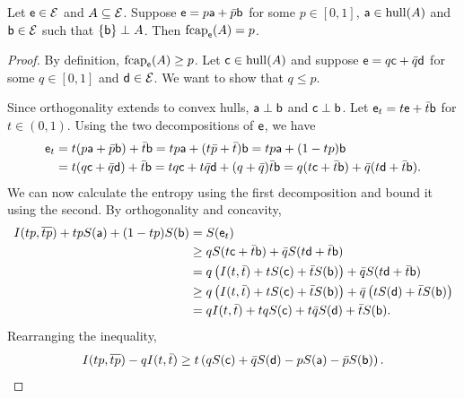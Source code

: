 \begin{mathSection}
\begin{prop}\label{pm-es-orthogonalComponentMaximality}
	Let $\ens \in \Ens$ and $A \subseteq \Ens$. Suppose $\ens = p\ens[a] + \bar{p}\ens[b]$ for some $p \in [0,1]$, $\ens[a] \in \hull(A)$ and $\ens[b] \in \Ens$ such that $\{\ens[b]\} \ortho A$. Then $\fcap_{\ens}(A) = p$.
\end{prop}

\begin{proof}
	By definition, $\fcap_{\ens}(A) \geq p$. Let $\ens[c] \in \hull(A)$ and suppose $\ens = q\ens[c] + \bar{q}\ens[d]$ for some $q \in [0,1]$ and $\ens[d] \in \Ens$. We want to show that $q \leq p$.
	
	Since orthogonality extends to convex hulls, $\ens[a] \ortho \ens[b]$ and $\ens[c] \ortho \ens[b]$. Let $\ens_t = t\ens + \bar{t}\ens[b]$ for $t \in (0,1)$. Using the two decompositions of $\ens$, we have
	\begin{equation}
		\begin{aligned}
			\ens_t &= t(p\ens[a] + \bar{p}\ens[b]) + \bar{t}\ens[b] = tp\ens[a] + (t\bar{p} + \bar{t})\ens[b] = tp\ens[a] + (1-tp)\ens[b] \\
			&= t(q\ens[c] + \bar{q}\ens[d]) + \bar{t}\ens[b] = tq\ens[c] + t\bar{q}\ens[d]
			+ (q+\bar{q})\bar{t}\ens[b] = q(t\ens[c] + \bar{t}\ens[b])
			+ \bar{q}(t\ens[d] + \bar{t}\ens[b]).
		\end{aligned}
	\end{equation}
	We can now calculate the entropy using the first decomposition and bound it using the second. By orthogonality and concavity,
	\begin{equation}
		\begin{aligned}
			I(tp,\overline{tp}) + tp S(\ens[a]) + (1-tp) S(\ens[b])
			&= S(\ens_t) \\
			&\geq q S(t\ens[c] + \bar{t}\ens[b])
			+ \bar{q} S(t\ens[d] + \bar{t}\ens[b]) \\
			&= q\left(I(t,\bar{t}) + t S(\ens[c])
			+ \bar{t} S(\ens[b])\right)
			+ \bar{q} S(t\ens[d] + \bar{t}\ens[b]) \\
			&\geq q\left(I(t,\bar{t}) + t S(\ens[c])
			+ \bar{t} S(\ens[b])\right)
			+ \bar{q}\left(t S(\ens[d]) + \bar{t} S(\ens[b])\right) \\
			&= q I(t,\bar{t}) + tq S(\ens[c])
			+ t\bar{q} S(\ens[d]) + \bar{t} S(\ens[b]).
		\end{aligned}
	\end{equation}
	Rearranging the inequality,
	\begin{equation}
		I(tp,\overline{tp}) - q I(t,\bar{t})
		\geq t\left(q S(\ens[c]) + \bar{q} S(\ens[d])
		- p S(\ens[a]) - \bar{p} S(\ens[b])\right).
	\end{equation}
	

\end{proof}
\end{mathSection}
